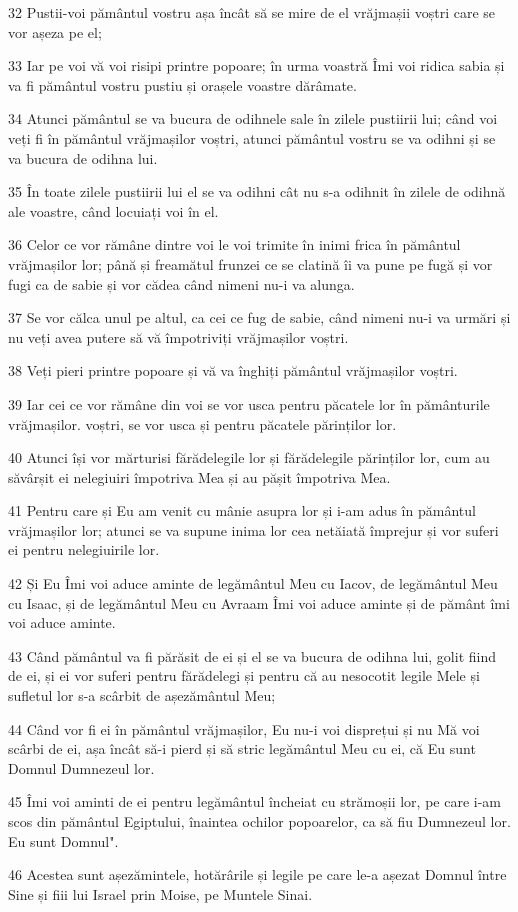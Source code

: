 \par 32 Pustii-voi pământul vostru așa încât să se mire de el vrăjmașii voștri care se vor așeza pe el;
\par 33 Iar pe voi vă voi risipi printre popoare; în urma voastră Îmi voi ridica sabia și va fi pământul vostru pustiu și orașele voastre dărâmate.
\par 34 Atunci pământul se va bucura de odihnele sale în zilele pustiirii lui; când voi veți fi în pământul vrăjmașilor voștri, atunci pământul vostru se va odihni și se va bucura de odihna lui.
\par 35 În toate zilele pustiirii lui el se va odihni cât nu s-a odihnit în zilele de odihnă ale voastre, când locuiați voi în el.
\par 36 Celor ce vor rămâne dintre voi le voi trimite în inimi frica în pământul vrăjmașilor lor; până și freamătul frunzei ce se clatină îi va pune pe fugă și vor fugi ca de sabie și vor cădea când nimeni nu-i va alunga.
\par 37 Se vor călca unul pe altul, ca cei ce fug de sabie, când nimeni nu-i va urmări și nu veți avea putere să vă împotriviți vrăjmașilor voștri.
\par 38 Veți pieri printre popoare și vă va înghiți pământul vrăjmașilor voștri.
\par 39 Iar cei ce vor rămâne din voi se vor usca pentru păcatele lor în pământurile vrăjmașilor. voștri, se vor usca și pentru păcatele părinților lor.
\par 40 Atunci își vor mărturisi fărădelegile lor și fărădelegile părinților lor, cum au săvârșit ei nelegiuiri împotriva Mea și au pășit împotriva Mea.
\par 41 Pentru care și Eu am venit cu mânie asupra lor și i-am adus în pământul vrăjmașilor lor; atunci se va supune inima lor cea netăiată împrejur și vor suferi ei pentru nelegiuirile lor.
\par 42 Și Eu Îmi voi aduce aminte de legământul Meu cu Iacov, de legământul Meu cu Isaac, și de legământul Meu cu Avraam Îmi voi aduce aminte și de pământ îmi voi aduce aminte.
\par 43 Când pământul va fi părăsit de ei și el se va bucura de odihna lui, golit fiind de ei, și ei vor suferi pentru fărădelegi și pentru că au nesocotit legile Mele și sufletul lor s-a scârbit de așezământul Meu;
\par 44 Când vor fi ei în pământul vrăjmașilor, Eu nu-i voi disprețui și nu Mă voi scârbi de ei, așa încât să-i pierd și să stric legământul Meu cu ei, că Eu sunt Domnul Dumnezeul lor.
\par 45 Îmi voi aminti de ei pentru legământul încheiat cu strămoșii lor, pe care i-am scos din pământul Egiptului, înaintea ochilor popoarelor, ca să fiu Dumnezeul lor. Eu sunt Domnul".
\par 46 Acestea sunt așezămintele, hotărârile și legile pe care le-a așezat Domnul între Sine și fiii lui Israel prin Moise, pe Muntele Sinai.

